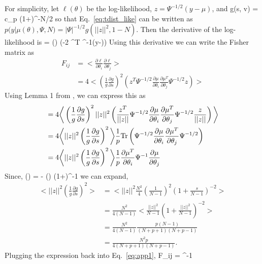 For simplicity, let $\ell(\theta)$ be the log-likelihood, $z = \Psi^{-1/2} (y - \mu)$, and 
\beq
g(s, v) = c_p \left(1+\right)^{-N/2}
\eeq
so that Eq.~\ref{eq:tdist_like} can be written as $p(y|\mu(\theta),\Psi,N) = |\Psi|^{-1/2} g(||z||^2, 1-N)$.
Then the derivative of the log-likelihood is  
\beq
{} = \left(\right) \left(-2 ^T \Psi^{-1}(y-\mu)\right) 
\eeq
Using this derivative we can write the Fisher matrix as  
\begin{align}
F_{ij} &= \bigg<\frac{\partial \ell}{\partial \theta_i} \frac{\partial \ell}{\partial \theta_j}\bigg> \\ 
&= 4\bigg< \left(\frac{1}{g}\frac{\partial g}{\partial s}\right)^2
\left(z^T\Psi^{-1/2}\frac{\partial \mu}{\partial \theta_i} \frac{\partial \mu^T}{\partial \theta_j}\Psi^{-1/2} z \right)\bigg> 
\end{align}
Using Lemma 1 from \cite{lange1989}, we can express this as 
\begin{align} \label{eq:app1}
&= 4\bigg< \left(\frac{1}{g}\frac{\partial g}{\partial s}\right)^2
||z||^2 \left(\frac{z^T}{||z||}\Psi^{-1/2}\frac{\partial \mu}{\partial \theta_i} \frac{\partial \mu^T}{\partial \theta_j}\Psi^{-1/2}\frac{z}{||z||} \right)\bigg> \\
&= 4\bigg<||z||^2 \left(\frac{1}{g}\frac{\partial g}{\partial s}\right)^2 \bigg>
\frac{1}{p} {\rm Tr}\left(\Psi^{-1/2}\frac{\partial \mu}{\partial \theta_i} \frac{\partial \mu^T}{\partial \theta_j}\Psi^{-1/2}\right) \\
&= 4\bigg<||z||^2 \left(\frac{1}{g}\frac{\partial g}{\partial s}\right)^2 \bigg> \frac{1}{p}\frac{\partial \mu^T}{\partial \theta_i}\Psi^{-1}\frac{\partial \mu}{\partial \theta_j}
\end{align}
Since, 
\beq
\left(\right) = - \left(\right) \left(1+\right)^{-1} 
\eeq
we can expand, 
\begin{align}
\bigg<||z||^2 \left(\frac{1}{g}\frac{\partial g}{\partial s}\right)^2 \bigg> &= \bigg<||z||^2 \frac{N^2}{4} \left(\frac{1}{N-1}\right)^2 \left(1+\frac{s}{N-1}\right)^{-2} \bigg> \\
&= \frac{N^2}{4(N-1)}\bigg<\frac{||z||^2}{N-1} \left(1+\frac{||z||^2}{N-1}\right)^{-2} \bigg>\\
&= \frac{N^2}{4(N-1)}\frac{p (N-1)}{(N+p+1)(N+p-1)}\\
&= \frac{N^2 p}{4(N+p+1)(N+p-1)}.
\end{align}
Plugging the expression back into Eq.~\ref{eq:app1}, 
\beq
F_{ij} = \Psi^{-1}
\eeq

